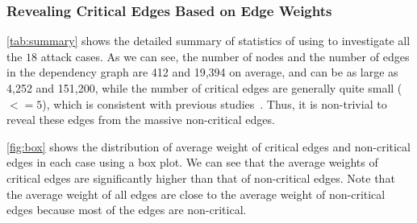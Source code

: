 


% 



\subsubsection{Revealing Critical Edges Based on Edge Weights}
\label{subsec:graphreduction}







\cref{tab:summary} shows the detailed summary of statistics of using \tool to investigate all the $18$ attack cases. 
As we can see, the number of nodes and the number of edges in the dependency graph are 412 and 19,394 on average, and can be as large as 4,252 and 151,200, while the number of critical edges are generally quite small ($<=5$), which is consistent with previous studies~\cite{mcitracking,ma2016protracer,backtracking,backtracking2}.
Thus, it is non-trivial to reveal these edges from the massive non-critical edges.

\cref{fig:box} shows the distribution of average weight of critical edges and non-critical edges in each case using a box plot.
We can see that the average weights of critical edges are significantly higher than that of non-critical edges. 
Note that the average weight of all edges are close to the average weight of non-critical edges because most of the edges are non-critical. 

